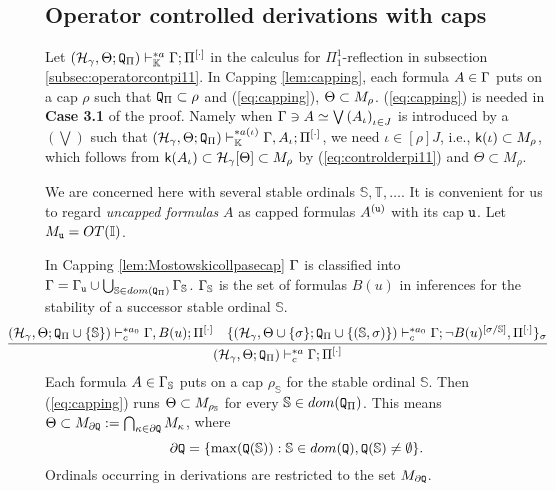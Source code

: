 \documentclass{article}
\newcommand{\mS}{\mathbb{S}}
\newcommand{\mI}{\mathbb{I}}
\newcommand{\mT}{\mathbb{T}}
\newcommand{\mK}{\mathbb{K}}
\begin{document}
\subsection{Operator controlled derivations with caps}




Let $
(\mathcal{H}_{\gamma},\Theta;{\tt Q}_{\Pi}
)\vdash^{* a}_{\mK}\Gamma;\Pi^{[\cdot]}
$ in the calculus for $\Pi^{1}_{1}$-reflection in subsection \ref{subsec:operatorcontpi11}.
In Capping \ref{lem:capping}, each formula $A\in\Gamma$ puts on a cap
$\rho$ such that ${\tt Q}_{\Pi}\subset \rho$ and
(\ref{eq:capping}), $\Theta\subset M_{\rho}$.
(\ref{eq:capping}) is needed in \textbf{Case 3.1} of the proof.
Namely 
when $\Gamma\ni A\simeq\bigvee\left(A_{\iota}\right)_{\iota\in J}$ is introduced by a $(\bigvee)$
such that
$(\mathcal{H}_{\gamma},\Theta;{\tt Q}_{\Pi})\vdash^{* a(\iota)}_{\mK}
\Gamma,A_{\iota};\Pi^{[\cdot]}$,
we need $\iota\in[\rho]J$, i.e., ${\sf k}(\iota)\subset M_{\rho}$, which follows from
${\sf k}(A_{\iota})\subset\mathcal{H}_{\gamma}[\Theta]\subset 
M_{\rho}$ by (\ref{eq:controlderpi11}) and $\Theta\subset M_{\rho}$.

We are concerned here with several stable ordinals $\mS,\mT,\ldots$.
It is convenient for us to regard \textit{uncapped formulas} $A$ as capped formulas
$A^{({\tt u})}$ with its cap ${\tt u}$.
Let $M_{{\tt u}}=OT(\mI)$.

In Capping \ref{lem:Mostowskicollpasecap} $\Gamma$ is classified into 
$\Gam=\Gam_{{\tt u}}\cup\bigcup_{\mS\in dom({\tt Q}_{\Pi})}\Gam_{\mS}$.
$\Gam_{\mS}$ is the set of formulas $B(u)$ in inferences for the stability of a successor stable
ordinal $\mS$.
{\small
\[
\hspace{-10mm}
\infer{(\mathcal{H}_{\gamma},\Theta;{\tt Q}_{\Pi})\vdash^{* a}_{c} \Gamma;\Pi^{[\cdot]}}
{
(\mathcal{H}_{\gamma},\Theta;{\tt Q}_{\Pi}\cup\{\mS\}
)\vdash^{* a_{0}}_{c}
\Gamma, B(u);\Pi^{[\cdot]}
&
\{
(\mathcal{H}_{\gamma},\Theta\cup\{\sig\};
{\tt Q}_{\Pi}\cup\{(\mS,\sigma)\}
)
\vdash^{* a_{0}}_{c}
\Gamma; \lnot B(u)^{[\sigma/\mathbb{S}]},\Pi^{[\cdot]}
\}_{\sig}
}
\]
}
Each formula $A\in\Gam_{\mS}$ puts on a cap $\rho_{\mS}$ for the stable ordinal $\mS$.
Then (\ref{eq:capping}) runs $\Tht\subset M_{\rho_{\mS}}$ for every $\mS\in dom({\tt Q}_{\Pi})$.
This means $\Theta\subset M_{\partial{\tt Q}}:=\bigcap_{\kappa\in\partial{\tt Q}}M_{\kappa}$, where
\[
\partial{\tt Q}=\{\max({\tt Q}(\mS)) : \mS\in dom({\tt Q}), {\tt Q}(\mS)\neq\emptyset\}.
\]
Ordinals occurring in derivations are restricted to the set $M_{\partial{\tt Q}}$.
\\
\end{document}
